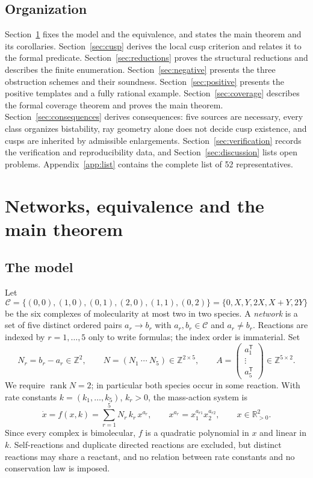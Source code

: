 \documentclass[11pt,a4paper]{article}
\theoremstyle{plain}
\theoremstyle{definition}
\theoremstyle{remark}
\numberwithin{equation}{section}
\newcommand{\R}{\mathbb{R}}
\newcommand{\Z}{\mathbb{Z}}
\newcommand{\T}{\mathsf{T}}
\newcommand{\rank}{\operatorname{rank}}
\newcommand{\Class}{\mathcal{C}}
\begin{document}
\subsection{Organization}
Section~\ref{sec:model} fixes the model and the equivalence, and states the main theorem and its corollaries. Section~\ref{sec:cusp} derives the local cusp criterion and relates it to the formal predicate. Section~\ref{sec:reductions} proves the structural reductions and describes the finite enumeration. Section~\ref{sec:negative} presents the three obstruction schemes and their soundness. Section~\ref{sec:positive} presents the positive templates and a fully rational example. Section~\ref{sec:coverage} describes the formal coverage theorem and proves the main theorem. Section~\ref{sec:consequences} derives consequences: five sources are necessary, every class organizes bistability, ray geometry alone does not decide cusp existence, and cusps are inherited by admissible enlargements. Section~\ref{sec:verification} records the verification and reproducibility data, and Section~\ref{sec:discussion} lists open problems. Appendix~\ref{app:list} contains the complete list of 52 representatives.

\section{Networks, equivalence and the main theorem}\label{sec:model}

\subsection{The model}
Let
\[
 \Class=\{(0,0),(1,0),(0,1),(2,0),(1,1),(0,2)\}=\{0,X,Y,2X,X+Y,2Y\}
\]
be the six complexes of molecularity at most two in two species. A \emph{network} is a set of five distinct ordered pairs $a_r\to b_r$ with $a_r,b_r\in\Class$ and $a_r\ne b_r$. Reactions are indexed by $r=1,\dots,5$ only to write formulas; the index order is immaterial. Set
\[
 N_r=b_r-a_r\in\Z^2,\qquad N=(N_1\ \cdots\ N_5)\in\Z^{2\times5},\qquad
 A=\begin{pmatrix}a_1^{\T}\\ \vdots\\ a_5^{\T}\end{pmatrix}\in\Z^{5\times2}.
\]
We require $\rank N=2$; in particular both species occur in some reaction. With rate constants $k=(k_1,\dots,k_5)$, $k_r>0$, the mass-action system is
\begin{equation}\label{eq:mass}
 \dot x=f(x,k)=\sum_{r=1}^5 N_r\,k_r\,x^{a_r},\qquad x^{a_r}=x_1^{a_{r1}}x_2^{a_{r2}},\qquad x\in\R^2_{>0}.
\end{equation}
Since every complex is bimolecular, $f$ is a quadratic polynomial in $x$ and linear in $k$. Self-reactions and duplicate directed reactions are excluded, but distinct reactions may share a reactant, and no relation between rate constants and no conservation law is imposed.
\end{document}
